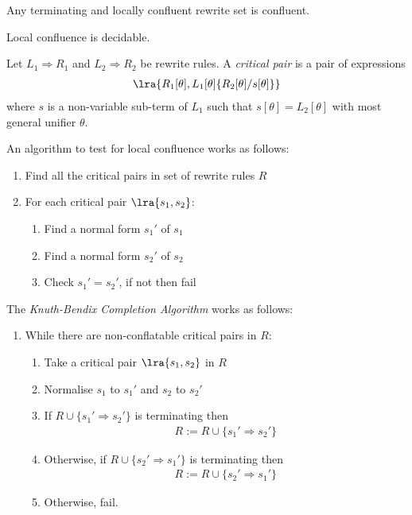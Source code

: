 \documentclass{article}
\begin{document}
\begin{lemma}[Newman]
	Any terminating and locally confluent rewrite set is confluent.
\end{lemma}

\begin{theorem}
	Local confluence is decidable.
\end{theorem}

\begin{definition}
	Let $L_1\Rightarrow R_1$ and $L_2\Rightarrow R_2$ be rewrite rules. A \emph{critical pair} is
	a pair of expressions
	\begin{align*}
		\lra{R_1[\theta], L_1[\theta]\{R_2[\theta]/s[\theta]\}}
	\end{align*}
	where $s$ is a non-variable sub-term of $L_1$ such that $s[\theta]=L_2[\theta]$ with
	most general unifier $\theta$.
\end{definition}

\begin{theorem}
	An algorithm to test for local confluence works as follows:
	\begin{enumerate}
		\item Find all the critical pairs in set of rewrite rules $R$
		\item For each critical pair $\lra{s_1, s_2}$: \begin{enumerate}
			      \item Find a normal form $s_1'$ of $s_1$
			      \item Find a normal form $s_2'$ of $s_2$
			      \item Check $s_1'=s_2'$, if not then fail
		      \end{enumerate}
	\end{enumerate}
\end{theorem}

\begin{theorem}
	The \emph{Knuth-Bendix Completion Algorithm} works as follows:
	\begin{enumerate}
		\item While there are non-conflatable critical pairs in $R$: \begin{enumerate}
			      \item Take a critical pair $\lra{s_1, s_2}$ in $R$
			      \item Normalise $s_1$ to $s_1'$ and $s_2$ to $s_2'$
			      \item If $R\cup\{s_1'\Rightarrow s_2'\}$ is terminating then \begin{align*}
				            R := R \cup \{s_1'\Rightarrow s_2'\}
			            \end{align*}
			      \item Otherwise, if $R\cup\{s_2'\Rightarrow s_1'\}$ is terminating then \begin{align*}
				            R := R \cup \{s_2' \Rightarrow s_1'\}
			            \end{align*}
			      \item Otherwise, fail.
		      \end{enumerate}
	\end{enumerate}
\end{theorem}
\end{document}
